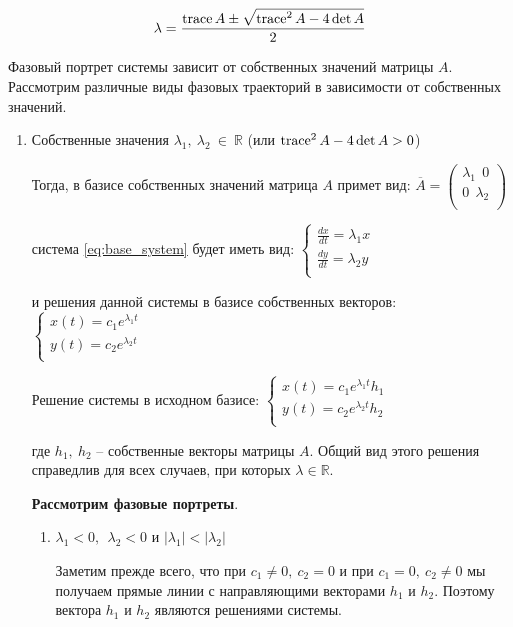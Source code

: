 \[ \lambda = \frac{\operatorname{trace} A \pm \sqrt{\operatorname{trace}^2 A - 4 \det A}}{2} \]

Фазовый портрет системы зависит от собственных значений матрицы $A$. Рассмотрим различные виды фазовых траекторий в зависимости от собственных значений.

\begin{enumerate}
  \item Собственные значения  $\lambda_1, ~ \lambda_2 ~ \in ~ \mathbb{R}$ (или $\operatorname{trace}^2 A - 4 \det A > 0$)
  
  Тогда, в базисе собственных значений матрица $A$ примет вид:
  $\overline{A} = 
  \begin{pmatrix}
    \lambda_1 ~~ 0 \\
    0 ~~ \lambda_2 \\
  \end{pmatrix}$

  система \eqref{eq:base_system} будет иметь вид:
  $\begin{cases}
    \frac{d x}{d t} = \lambda_1 x \\
    \frac{d y}{d t} = \lambda_2 y \\        
  \end{cases}$

  и решения данной системы в базисе собственных векторов:
  $\begin{cases}
    x(t) = c_1 e^{\lambda_1 t} \\
    y(t) = c_2 e^{\lambda_2 t} \\
  \end{cases}$

  Решение системы в исходном базисе:
  $\begin{cases}
    x(t) = c_1 e^{\lambda_1 t} h_1 \\
    y(t) = c_2 e^{\lambda_2 t} h_2 \\
  \end{cases}$

  где $h_1, ~ h_2$ -- собственные векторы матрицы $A$. Общий вид этого решения справедлив для всех случаев, при которых $\lambda \in \mathbb{R}$.
  
  \textbf{Рассмотрим фазовые портреты}.
  
  \begin{enumerate}
  	\item $\lambda_1 < 0, ~~ \lambda_2 < 0$ и $|\lambda_1| < |\lambda_2|$
  	
  	Заметим прежде всего, что при $c_1 \neq 0, ~ c_2 = 0$ и при $c_1 = 0, ~ c_2 \neq 0$ мы получаем прямые линии с направляющими векторами $h_1$ и $h_2$. Поэтому вектора $h_1$ и $h_2$ являются решениями системы.
  	

\end{enumerate}
\end{enumerate}
